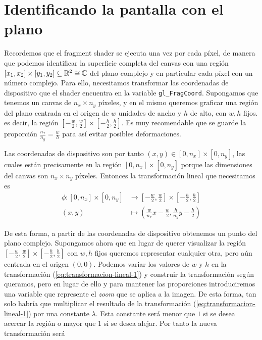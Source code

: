 \section{Identificando la pantalla con el plano}
\label{section:pantalla-plano}


Recordemos que el fragment shader se ejecuta una vez por cada píxel, de manera que podemos identificar la superficie completa del canvas con una región $[x_1,x_2]\times [y_1,y_2]\subseteq\mathbb{R}^2\cong\mathbb{C}$ del plano complejo y en particular cada píxel con un número complejo. Para ello, necesitamos transformar las coordenadas de dispositivo que el shader encuentra en la variable \verb|gl_FragCoord|. Supongamos que tenemos un canvas de $n_x\times n_y$ píxeles, y en el mismo queremos graficar una región del plano centrada en el origen de $w$ unidades de ancho y $h$ de alto, con $w,h$ fijos. es decir, la región $\left[-\frac{w}{2},\frac{w}{2}\right]\times\left[-\frac{h}{2},\frac{h}{2}\right]$. Es muy recomendable que se guarde la proporción $\frac{n_x}{n_y}=\frac{w}{h}$ para así evitar posibles deformaciones.

Las coordenadas de dispositivo son por tanto $(x,y)\in[0,n_x]\times[0,n_y]$, las cuales están precisamente en la región $[0,n_x]\times[0,n_y]$ porque las dimensiones del canvas son $n_x\times n_y$ píxeles. Entonces la transformación lineal que necesitamos es 
\begin{equation}
\label{eq:transformacion-lineal-1}
\begin{split}
    \phi:[0,n_x]\times[0,n_y] & \longrightarrow \left[-\frac{w}{2},\frac{w}{2}\right]\times\left[-\frac{h}{2},\frac{h}{2}\right] \\
    (x,y) & \longmapsto \left(\frac{w}{n_x}x-\frac{w}{2},\frac{h}{n_y}y-\frac{h}{2}\right)
\end{split}
\end{equation}

De esta forma, a partir de las coordenadas de dispositivo obtenemos un punto del plano complejo. Supongamos ahora que en lugar de querer visualizar la región $\left[-\frac{w}{2},\frac{w}{2}\right]\times\left[-\frac{h}{2},\frac{h}{2}\right]$ con $w,h$ fijos queremos representar cualquier otra, pero aún centrada en el origen $(0,0)$. Podemos variar los valores de $w$ y $h$ en la transformación (\ref{eq:transformacion-lineal-1}) y construir la transformación según queramos, pero en lugar de ello y para mantener las proporciones introduciremos una variable que represente el \textit{zoom} que se aplica a la imagen. De esta forma, tan solo habría que multiplicar el resultado de la transformación (\ref{eq:transformacion-lineal-1}) por una constante $\lambda$. Esta constante será menor que $1$ si se desea acercar la región o mayor que $1$ si se desea alejar. Por tanto la nueva transformación será

